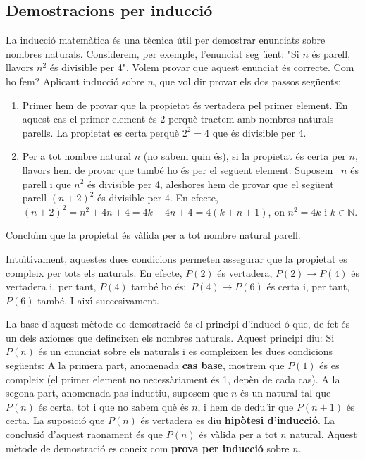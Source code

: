 \subsection{Demostracions per inducci\'{o}\label{4}}

La inducci\'{o} matem\`{a}tica \'{e}s una t\`{e}cnica \'{u}til per demostrar
enunciats sobre nombres naturals. Considerem, per exemple, l'enunciat seg%
\"{u}ent: "Si $n$ \'{e}s parell, llavors $n^{2}$ \'{e}s divisible per 4".
Volem provar que aquest enunciat \'{e}s correcte. Com ho fem? Aplicant
inducci\'{o} sobre $n$, que vol dir provar els dos passos seg\"{u}ents:

\begin{enumerate}
\item Primer hem de provar que la propietat \'{e}s vertadera pel primer
element. En aquest cas el primer element \'{e}s $2$ perqu\`{e} tractem amb
nombres naturals parells. La propietat es certa perqu\`{e} $2^{2}=4$ que
\'{e}s divisible per 4.

\item Per a tot nombre natural $n$ (no sabem quin \'{e}s), si la propietat
\'{e}s certa per $n$, llavors hem de provar que tamb\'{e} ho \'{e}s per el
seg\"{u}ent element: Suposem \ $n$ \'{e}s parell i que $n^{2}$ \'{e}s
divisible per 4, aleshores hem de provar que el seg\"{u}ent parell $%
(n+2)^{2} $ \'{e}s divisible per 4. En efecte, $%
(n+2)^{2}=n^{2}+4n+4=4k+4n+4=4(k+n+1)$, on $n^{2}=4k$ i $k\in\mathbb{N}$.
\end{enumerate}

Conclu\"{\i}m que la propietat \'{e}s v\`{a}lida per a tot nombre natural
parell.

Intu\"{\i}tivament, aquestes dues condicions permeten assegurar que la
propietat es compleix per tots els naturals. En efecte, $P(2)$ \'{e}s
vertadera, $P(2)\longrightarrow P(4)$ \'{e}s vertadera i, per tant, $P(4)$
tamb\'{e} ho \'{e}s;\ $P(4)\longrightarrow P(6)$ \'{e}s certa i, per tant, $%
P(6)$ tamb\'{e}. I aix\'{\i} succesivament.

\bigskip

La base d'aquest m\`{e}tode de demostraci\'{o} \'{e}s el principi d'inducci%
\'{o} que, de fet \'{e}s un dels axiomes que defineixen els nombres
naturals. Aquest principi diu: Si $P(n)$ \'{e}s un enunciat sobre els
naturals i es compleixen les dues condicions seg\"{u}ents: A la primera
part, anomenada \textbf{cas base}, mostrem que $P(1)$ \'{e}s es compleix (el
primer element no necess\`{a}riament \'{e}s 1, dep\`{e}n de cada cas). A la
segona part, anomenada pas inductiu, suposem que $n$ \'{e}s un natural tal
que $P(n)$ \'{e}s certa, tot i que no sabem qu\`{e} \'{e}s $n$, i hem de dedu%
\"{\i}r que $P(n+1)$ \'{e}s certa. La suposici\'{o} que $P(n)$ \'{e}s
vertadera es diu \textbf{hip\`{o}tesi d'inducci\'{o}}. La conclusi\'{o}
d'aquest raonament \'{e}s que $P(n)$ \'{e}s v\`{a}lida per a tot $n$
natural. Aquest m\`{e}tode de demostraci\'{o} es coneix com \textbf{prova
per inducci\'{o}} sobre $n$.

